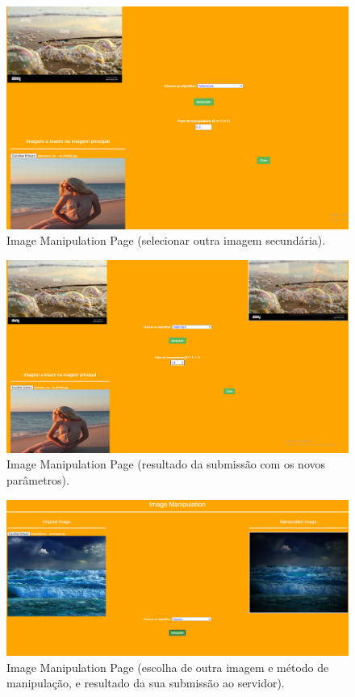\documentclass{report}
\begin{document}
    \begin{figure}[!hbtp]
        \centering 
        \includegraphics[scale=0.29]{Images_code/0 - image manipulation 6_0.png}
        \caption{\label{Image Manipulation}Image Manipulation Page (selecionar outra imagem secundária).}
    \end{figure}

    \begin{figure}[!hbtp]
        \centering 
        \includegraphics[scale=0.29]{Images_code/0 - image manipulation 6.png}
        \caption{\label{Image Manipulation}Image Manipulation Page (resultado da submissão com os novos parâmetros).}
    \end{figure}

    \begin{figure}[!hbtp]
        \centering 
        \includegraphics[scale=0.29]{Images_code/0 - image manipulation 7.png}
        \caption{\label{Image Manipulation}Image Manipulation Page (escolha de outra imagem e método de manipulação, e resultado da sua submissão ao servidor).}
    \end{figure}
\end{document}
